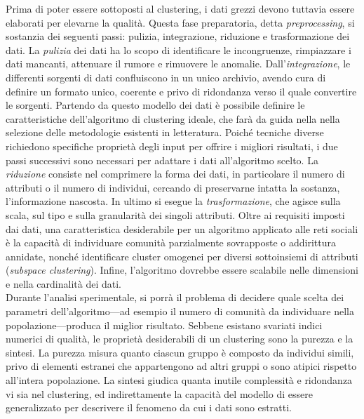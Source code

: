 Prima di poter essere sottoposti al clustering, i dati grezzi devono tuttavia essere elaborati per elevarne la qualit\`a. Questa fase preparatoria, detta \textit{preprocessing}, si sostanzia dei seguenti passi: pulizia, integrazione, riduzione e trasformazione dei dati. La \textit{pulizia} dei dati ha lo scopo di identificare le incongruenze, rimpiazzare i dati mancanti, attenuare il rumore e rimuovere le anomalie. Dall'\textit{integrazione}, le differenti sorgenti di dati confluiscono in un unico archivio, avendo cura di definire un formato unico, coerente e privo di ridondanza verso il quale convertire le sorgenti. Partendo da questo modello dei dati \`e possibile definire le caratteristiche dell'algoritmo di clustering ideale, che far\`a da guida nella nella selezione delle metodologie esistenti in letteratura. Poich\'e tecniche diverse richiedono specifiche propriet\`a degli input per offrire i migliori risultati, i due passi successivi sono necessari per adattare i dati all'algoritmo scelto. La \textit{riduzione} consiste nel comprimere la forma dei dati, in particolare il numero di attributi o il numero di individui, cercando di preservarne intatta la sostanza, l'informazione nascosta. In ultimo si esegue la \textit{trasformazione}, che agisce sulla scala, sul tipo e sulla granularit\`a dei singoli attributi. Oltre ai requisiti imposti dai dati, una caratteristica desiderabile per un algoritmo applicato alle reti sociali \`e la capacit\`a di individuare comunit\`a parzialmente sovrapposte o addirittura annidate, nonch\'e identificare cluster omogenei per diversi sottoinsiemi di attributi (\textit{subspace clustering}). Infine, l'algoritmo dovrebbe essere scalabile nelle dimensioni e nella cardinalit\`a dei dati.\\
Durante l'analisi sperimentale, si porr\`a il problema di decidere quale scelta dei parametri dell'algoritmo---ad esempio il numero di comunit\`a da individuare nella popolazione---produca il miglior risultato. Sebbene esistano svariati indici numerici di qualit\`a, le propriet\`a desiderabili di un clustering sono la purezza e la sintesi. La purezza misura quanto ciascun gruppo \`e composto da individui simili, privo di elementi estranei che appartengono ad altri gruppi o sono atipici rispetto all'intera popolazione. La sintesi giudica quanta inutile complessit\`a e ridondanza vi sia nel clustering, ed indirettamente la capacit\`a del modello di essere generalizzato per descrivere il fenomeno da cui i dati sono estratti.

